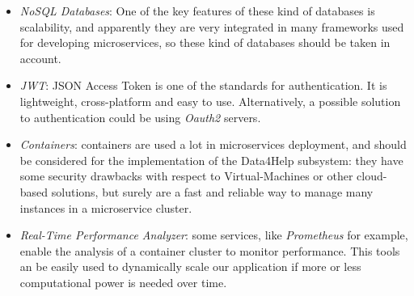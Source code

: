 \begin{itemize}
	\item  \textit{NoSQL Databases}: One of the key features of these kind of databases is scalability, and apparently they are very integrated in many frameworks used for developing microservices, so these kind of databases should be taken in account.
	\item  \textit{JWT}: JSON Access Token is one of the standards for authentication. It is lightweight, cross-platform and easy to use. Alternatively, a possible solution to authentication could be using \textit{Oauth2} servers.
	\item  \textit{Containers}: containers are used a lot in microservices deployment, and should be considered for the implementation of the Data4Help subsystem: they have some security drawbacks with respect to Virtual-Machines or other cloud-based solutions, but surely are a fast and reliable way to manage many instances in a microservice cluster.
	\item  \textit{Real-Time Performance Analyzer}: some services, like \textit{Prometheus} for example, enable the analysis of a container cluster to monitor performance. This tools an be easily used to dynamically scale our application if more or less computational power is needed over time.
\end{itemize}